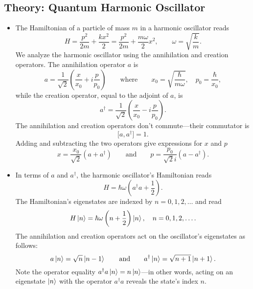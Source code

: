 \documentclass[11pt, a4paper]{article}
\newcommand{\eqtext}[1]{\qquad \text{#1} \qquad}
\begin{document}
\subsection{Theory: Quantum Harmonic Oscillator}
\begin{itemize}
	\item The Hamiltonian of a particle of mass $ m $ in a harmonic oscillator reads
	\begin{equation*}
		H = \frac{p^{2}}{2m} + \frac{kx^{2}}{2} = \frac{p^{2}}{2m} + \frac{m\omega}{2}x^{2}, \qquad \omega = \sqrt{\frac{k}{m}}.
	\end{equation*}
	We analyze the harmonic oscillator using the annihilation and creation operators. The annihilation operator $ a $ is
	\begin{equation*}
		a = \frac{1}{\sqrt{2}}\left(\frac{x}{x_{0}} + i\frac{p}{p_{0}}\right) \eqtext{where} x_{0} = \sqrt{\frac{\hbar}{m\omega}}, \quad p_{0} = \frac{\hbar}{x_{0}},
	\end{equation*}
	while the creation operator, equal to the adjoint of $ a $, is
	\begin{equation*}
		a^{\dagger} = \frac{1}{\sqrt{2}}\left(\frac{x}{x_{0}} - i\frac{p}{p_{0}}\right).
	\end{equation*}
	The annihilation and creation operators don't commute---their commutator is 
	\begin{equation*}
		\big[a, a^{\dagger}\big] = 1.
	\end{equation*}
	Adding and subtracting the two operators give expressions for $ x $ and $ p $
	\begin{equation*}
		x = \frac{x_{0}}{\sqrt{2}}(a + a^{\dagger}) \eqtext{and} p = \frac{p_{0}}{\sqrt{2}i}(a - a^{\dagger}).
	\end{equation*}
	
	\item In terms of $ a $ and $ a^{\dagger} $, the harmonic oscillator's Hamiltonian reads
	\begin{equation*}
		H = \hbar \omega\left (a^{\dagger}a + \frac{1}{2}\right ).
	\end{equation*}
	The Hamiltonian's eigenstates are indexed by $ n = 0, 1, 2, \ldots $ and read
	\begin{equation*}
		H \ket{n} = \hbar \omega \left(n + \frac{1}{2}\right)\ket{n}, \quad n = 0, 1, 2, \ldots.
	\end{equation*}
	The annihilation and creation operators act on the oscillator's eigenstates as follows:
	\begin{equation*}
		a\ket{n} = \sqrt{n}\ket{n-1} \eqtext{and} a^{\dagger} \ket{n} = \sqrt{n + 1} \ket{n+1}.
	\end{equation*}
	Note the operator equality $ a^{\dagger}a \ket{n} = n \ket{n}$---in other words, acting on an eigenstate $ \ket{n} $  with the operator $ a^{\dagger}a $ reveals the state's index $ n $. 
\end{itemize}
\end{document}
